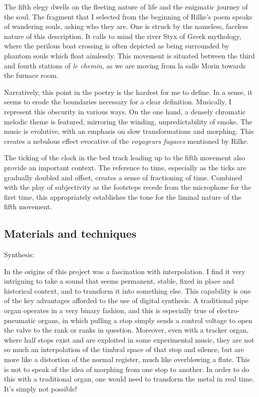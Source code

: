 \documentclass[12pt,twoside,maitrise]{dms_ks}
\theoremstyle{definition}
\begin{document}
{The fifth elegy dwells on the fleeting nature of life and the enigmatic journey of the soul. The fragment that I selected from the beginning of Rilke's poem speaks of wandering souls, asking who they are. One is struck by the nameless, faceless nature of this description. It calls to mind the river Styx of Greek mythology, where the perilous boat crossing is often depicted as being surrounded by phantom souls which float aimlessly. This movement is situated between the third and fourth stations of \textit{le chemin}, as we are moving from la salle Morin towards the furnace room. 

Narratively, this point in the poetry is the hardest for me to define. In a sense, it seems to erode the boundaries necessary for a clear definition. Musically, I represent this obscurity in various ways. On the one hand, a densely chromatic melodic theme is featured, mirroring the winding, unpredictability of smoke. The music is evolutive, with an emphasis on slow transformations and morphing. This creates a nebulous effect evocative of the \textit{voyageurs fugaces} mentioned by Rilke. 

The ticking of the clock in the bed track leading up to the fifth movement also provide an important context. The reference to time, especially as the ticks are gradually doubled and offset, creates a sense of fractioning of time. Combined with the play of subjectivity as the footsteps recede from the microphone for the first time, this appropriately establishes the tone for the liminal nature of the fifth movement.

\subsection{Materials and techniques}

Synthesis:

In the origins of this project was a fascination with interpolation.
I find it very intriguing to take a sound that seems permanent, stable, fixed in place and historical context, and to transform it into something else.
This capability is one of the key advantages afforded to the use of digital synthesis.
A traditional pipe organ operates in a very binary fashion, and this is especially true of electro-pneumatic organs, in which pulling a stop simply sends a control voltage to open the valve to the rank or ranks in question.
Moreover, even with a tracker organ, where half stops exist and are exploited in some experimental music, they are not so much an interpolation of the timbral space of that stop and silence, but are more like a distortion of the normal register, much like overblowing a flute.
This is not to speak of the idea of morphing from one stop to another.
In order to do this with a traditional organ, one would need to transform the metal in real time.
It's simply not possible!

}
\end{document}
